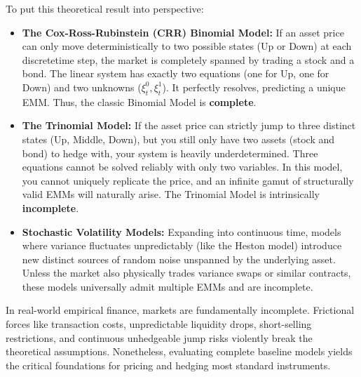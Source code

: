 To put this theoretical result into perspective:
\begin{itemize}
    \item \textbf{The Cox-Ross-Rubinstein (CRR) Binomial Model:} If an asset price can only move deterministically to two possible states (Up or Down) at each discretetime step, the market is completely spanned by trading a stock and a bond. The linear system has exactly two equations (one for Up, one for Down) and two unknowns ($\xi_t^0, \xi_t^1$). It perfectly resolves, predicting a unique EMM. Thus, the classic Binomial Model is \textbf{complete}.
    \item \textbf{The Trinomial Model:} If the asset price can strictly jump to three distinct states (Up, Middle, Down), but you still only have two assets (stock and bond) to hedge with, your system is heavily underdetermined. Three equations cannot be solved reliably with only two variables. In this model, you cannot uniquely replicate the price, and an infinite gamut of structurally valid EMMs will naturally arise. The Trinomial Model is intrinsically \textbf{incomplete}.
    \item \textbf{Stochastic Volatility Models:} Expanding into continuous time, models where variance fluctuates unpredictably (like the Heston model) introduce new distinct sources of random noise unspanned by the underlying asset. Unless the market also physically trades variance swaps or similar contracts, these models universally admit multiple EMMs and are incomplete.
\end{itemize}

In real-world empirical finance, markets are fundamentally incomplete. Frictional forces like transaction costs, unpredictable liquidity drops, short-selling restrictions, and continuous unhedgeable jump risks violently break the theoretical assumptions. Nonetheless, evaluating complete baseline models yields the critical foundations for pricing and hedging most standard instruments.
